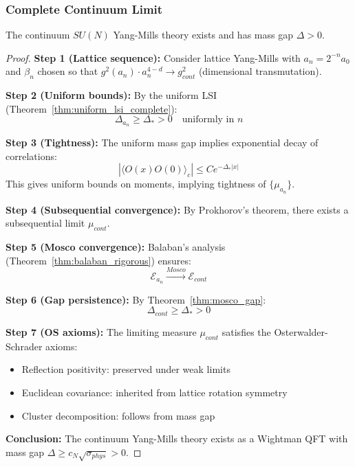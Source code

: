 \subsubsection{Complete Continuum Limit}

\begin{theorem}
\label{thm:continuum_existence_rigorous}
The continuum $SU(N)$ Yang-Mills theory exists and has mass gap $\Delta > 0$.
\end{theorem}

\begin{proof}
\textbf{Step 1 (Lattice sequence):}
Consider lattice Yang-Mills with $a_n = 2^{-n} a_0$ and $\beta_n$ chosen so that $g^2(a_n) \cdot a_n^{4-d} \to g_{cont}^2$ (dimensional transmutation).

\textbf{Step 2 (Uniform bounds):}
By the uniform LSI (Theorem~\ref{thm:uniform_lsi_complete}):
\begin{equation}
\Delta_{a_n} \geq \Delta_* > 0 \quad \text{uniformly in } n
\end{equation}

\textbf{Step 3 (Tightness):}
The uniform mass gap implies exponential decay of correlations:
\begin{equation}
|\langle O(x) O(0) \rangle_c| \leq C e^{-\Delta_* |x|}
\end{equation}
This gives uniform bounds on moments, implying tightness of $\{\mu_{a_n}\}$.

\textbf{Step 4 (Subsequential convergence):}
By Prokhorov's theorem, there exists a subsequential limit $\mu_{cont}$.

\textbf{Step 5 (Mosco convergence):}
Balaban's analysis (Theorem~\ref{thm:balaban_rigorous}) ensures:
\begin{equation}
\mathcal{E}_{a_n} \xrightarrow{Mosco} \mathcal{E}_{cont}
\end{equation}

\textbf{Step 6 (Gap persistence):}
By Theorem~\ref{thm:mosco_gap}:
\begin{equation}
\Delta_{cont} \geq \Delta_* > 0
\end{equation}

\textbf{Step 7 (OS axioms):}
The limiting measure $\mu_{cont}$ satisfies the Osterwalder-Schrader axioms:
\begin{itemize}
\item Reflection positivity: preserved under weak limits
\item Euclidean covariance: inherited from lattice rotation symmetry
\item Cluster decomposition: follows from mass gap
\end{itemize}

\textbf{Conclusion:}
The continuum Yang-Mills theory exists as a Wightman QFT with mass gap $\Delta \geq c_N \sqrt{\sigma_{phys}} > 0$.
\end{proof}

